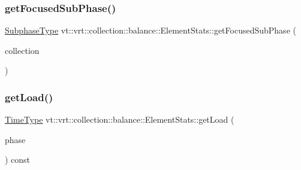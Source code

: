 \subsubsection{\texorpdfstring{get\+Focused\+Sub\+Phase()}{getFocusedSubPhase()}}
{\footnotesize\ttfamily \hyperlink{namespacevt_ae78cbfdf1e57470e33eedb074f2beeba}{Subphase\+Type} vt\+::vrt\+::collection\+::balance\+::\+Element\+Stats\+::get\+Focused\+Sub\+Phase (\begin{DoxyParamCaption}\item[{\hyperlink{namespacevt_a1b417dd5d684f045bb58a0ede70045ac}{Virtual\+Proxy\+Type}}]{collection }\end{DoxyParamCaption})\hspace{0.3cm}{\ttfamily [static]}}

\mbox{\label{structvt_1_1vrt_1_1collection_1_1balance_1_1_element_stats_aeb819ff1258eda6a7a1ccbd51b256731}} 
\subsubsection{\texorpdfstring{get\+Load()}{getLoad()}\hspace{0.1cm}{\footnotesize\ttfamily [1/2]}}
{\footnotesize\ttfamily \hyperlink{namespacevt_a876a9d0cd5a952859c72de8a46881442}{Time\+Type} vt\+::vrt\+::collection\+::balance\+::\+Element\+Stats\+::get\+Load (\begin{DoxyParamCaption}\item[{\hyperlink{namespacevt_a46ce6733d5cdbd735d561b7b4029f6d7}{Phase\+Type} const \&}]{phase }\end{DoxyParamCaption}) const}

\mbox{\label{structvt_1_1vrt_1_1collection_1_1balance_1_1_element_stats_a04ffe937cfa084fb7bb52820312ec9c2}} 
